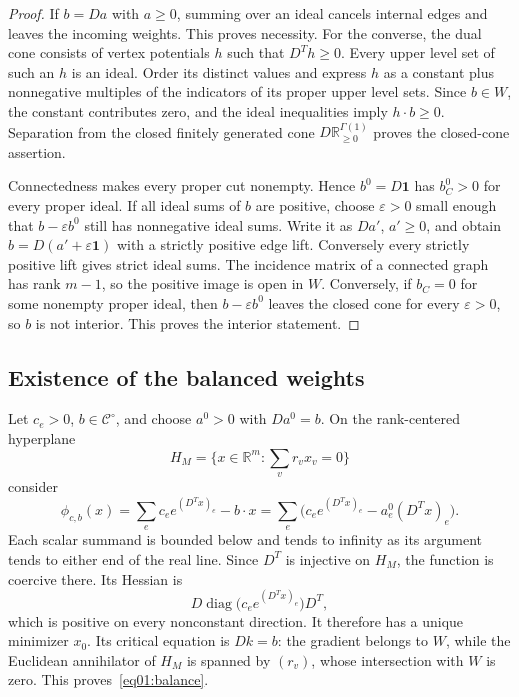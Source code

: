 \documentclass[11pt]{amsart}
\theoremstyle{definition}
\theoremstyle{remark}
\newcommand{\diag}{\operatorname{diag}}
\newcommand{\RR}{\mathbb R}
\newcommand{\cC}{\mathcal C}
\newcommand{\one}{\mathbf 1}
\begin{document}
\begin{proof}
If \(b=Da\) with \(a\geq0\), summing over an ideal cancels internal
edges and leaves the incoming weights. This proves necessity.
For the converse, the dual cone consists of vertex potentials \(h\)
such that \(D^Th\geq0\). Every upper level set of such an \(h\)
is an ideal. Order its distinct values and express \(h\) as a
constant plus nonnegative multiples of the indicators of its
proper upper level sets. Since \(b\in W\), the constant contributes
zero, and the ideal inequalities imply \(h\cdot b\geq0\).
Separation from the closed finitely generated cone
\(D\RR_{\geq0}^{\Gamma(1)}\) proves the closed-cone assertion.

Connectedness makes every proper cut nonempty. Hence
\(b^0=D\one\) has \(b^0_C>0\) for every proper ideal. If all ideal
sums of \(b\) are positive, choose \(\varepsilon>0\) small enough
that \(b-\varepsilon b^0\) still has nonnegative ideal sums.
Write it as \(Da'\), \(a'\geq0\), and obtain
\(b=D(a'+\varepsilon\one)\) with a strictly positive edge lift.
Conversely every strictly positive lift gives strict ideal sums.
The incidence matrix of a connected graph has rank \(m-1\), so the
positive image is open in \(W\). Conversely, if \(b_C=0\) for
some nonempty proper ideal, then \(b-\varepsilon b^0\) leaves the
closed cone for every \(\varepsilon>0\), so \(b\) is not interior.
This proves the interior statement.
\end{proof}

\subsection{Existence of the balanced weights}

Let \(c_e>0\), \(b\in\cC^\circ\), and choose \(a^0>0\) with
\(Da^0=b\). On the rank-centered hyperplane
\[
 H_M=\{x\in\RR^m:\sum_vr_vx_v=0\}
\]
consider
\begin{equation}\label{eq02:potential}
 \phi_{c,b}(x)=\sum_ec_e e^{(D^Tx)_e}-b\cdot x
 =\sum_e\bigl(c_e e^{(D^Tx)_e}-a_e^0(D^Tx)_e\bigr).
\end{equation}
Each scalar summand is bounded below and tends to infinity as its
argument tends to either end of the real line. Since \(D^T\) is
injective on \(H_M\), the function is coercive there. Its Hessian is
\[
 D\diag\bigl(c_e e^{(D^Tx)_e}\bigr)D^T,
\]
which is positive on every nonconstant direction.
It therefore has a unique minimizer \(x_0\).
Its critical equation is \(Dk=b\): the gradient belongs to \(W\),
while the Euclidean annihilator of \(H_M\) is spanned by
\((r_v)\), whose intersection with \(W\) is zero.
This proves~\eqref{eq01:balance}.
\end{document}
